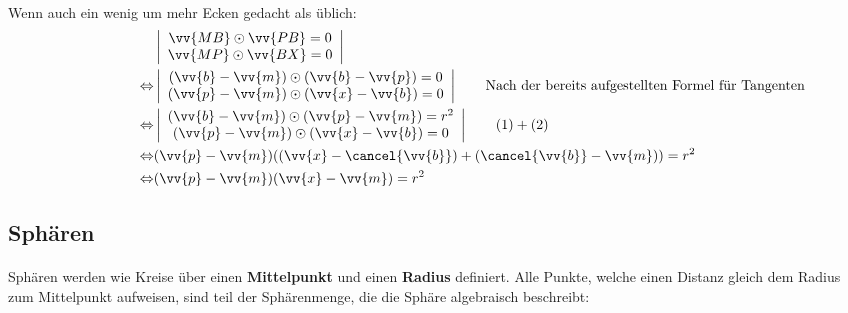 \documentclass[main.tex]{subfiles}
\begin{document}
            \paragraph{} Wenn auch ein wenig um mehr Ecken gedacht als üblich:
            \\
            \begin{align*}
                \qquad \qquad \qquad &\left|\begin{array}{c} \vv{MB} \odot \vv{PB} = 0 \\ \vv{MP} \odot \vv{BX} = 0 \end{array}\right| \\
                     \Leftrightarrow &\left|\begin{array}{c} (\vv{b} - \vv{m}) \odot (\vv{b} - \vv{p}) = 0 \\ (\vv{p} - \vv{m}) \odot (\vv{x} - \vv{b}) = 0 \end{array}\right| \qquad \text{Nach der bereits aufgestellten Formel für Tangenten} \\
                     \Leftrightarrow &\left|\begin{array}{c} (\vv{b} - \vv{m}) \odot (\vv{p} - \vv{m}) = r^2 \\ (\vv{p} - \vv{m}) \odot (\vv{x} - \vv{b}) = 0 \end{array}\right| \qquad (1) + (2) \\
                     \Leftrightarrow &(\vv{p} - \vv{m})((\vv{x} - \cancel{\vv{b}}) + (\cancel{\vv{b}} - \vv{m})) = r^2 \\
                     \Leftrightarrow &(\vv{p} - \vv{m})(\vv{x} - \vv{m}) = r^2 \\
            \end{align*}



    \subsection{Sphären}

        \paragraph{} Sphären werden wie Kreise über einen \textbf{Mittelpunkt} und einen \textbf{Radius} definiert. Alle Punkte, welche einen Distanz gleich dem Radius zum Mittelpunkt aufweisen, sind teil der Sphärenmenge, die die Sphäre algebraisch beschreibt:
\end{document}
